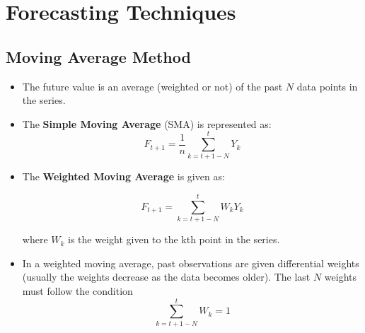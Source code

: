 \documentclass{article}
\theoremstyle{plain}
\theoremstyle{definition}
\begin{document}
\section{Forecasting Techniques}
\subsection{Moving Average Method}
\begin{itemize}
    \item The future value is an average (weighted or not) of the past $N$ data points in the series. 
    
    \item The \textbf{Simple Moving Average} (SMA) is represented as: 
    \begin{equation}
        F_{t+1} = \frac{1}{n} \sum_{k= t+1-N}^{t} Y_k
    \end{equation}
    
    \item The \textbf{Weighted Moving Average} is given as:
    
    \begin{equation}
        F_{t+1} = \sum_{k= t+1-N}^{t} W_k Y_k
    \end{equation}
    
    where $W_k$ is the weight given to the kth point in the series. 
    
    \item In a weighted moving average, past observations are given differential weights (usually the weights decrease as the data becomes older). The last $N$ weights must follow the condition
    \begin{equation*}
        \sum_{k= t+1-N}^{t} W_k = 1
    \end{equation*}
\end{itemize}
\end{document}
